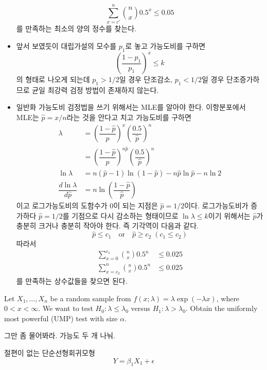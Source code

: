 \documentclass[answers]{exam}
\begin{document}
\begin{questions}
\begin{solution}
\begin{itemize}
      $$
        \sum_{x=c'}^{n}{{n}\choose{x}}0.5^{x}\leq 0.05
      $$
      를 만족하는 최소의 양의 정수를 찾는다.
      \item 앞서 보였듯이 대립가설의 모수를 $p_{1}$로 놓고 가능도비를 구하면
      $$
        \left(\dfrac{1-p_{1}}{p_{1}}\right)^{x} \leq k
      $$
      의 형태로 나오게 되는데 $p_{1}>1/2$일 경우 단조감소, $p_{1}<1/2$일 경우 단조증가하므로 균일 최강력 검정 방법이 존재하지 않는다.
      \item 일반화 가능도비 검정법을 쓰기 위해서는 MLE를 알아야 한다. 이항분포에서 MLE는 $\hat{p}=x/n$라는 것을 안다고 치고 가능도비를 구하면
      \begin{align}
        \lambda &= \left(\dfrac{1-\hat{p}}{\hat{p}}\right)^{x}\left(\dfrac{0.5}{\hat{p}}\right)^{n}\\
        &= \left(\dfrac{1-\hat{p}}{\hat{p}}\right)^{n\hat{p}}\left(\dfrac{0.5}{\hat{p}}\right)^{n}\\
        \ln \lambda &= n\left(\hat{p}-1\right)\ln\left(1-\hat{p}\right)-n\hat{p}\ln \hat{p}-n\ln 2\\
        \dfrac{d \ln \lambda}{d\hat{p}} &= n\ln \left(\dfrac{1-\hat{p}}{\hat{p}}\right)
      \end{align}
      이고 로그가능도비의 도함수가 0이 되는 지점은 $\hat{p}=1/2$이다. 로그가능도비가 증가하다 $\hat{p}=1/2$를 기점으로 다시 감소하는 형태이므로 $\ln \lambda \leq k$이기 위해서는 $\hat{p}$가 충분히 크거나 충분히 작아야 한다. 즉 기각역이 다음과 같다.
      $$
        \hat{p}\leq c_{1} \quad \text{or} \quad \hat{p} \geq c_{2}\;\left(c_{1}\leq c_{2}\right)
      $$
      따라서 
      \begin{align}
        \sum_{x=0}^{c_{1}}{{n}\choose{x}}0.5^{n} &\leq 0.025\\
        \sum_{x=c_{2}}^{n}{{n}\choose{x}}0.5^{n} &\leq 0.025
      \end{align}
      를 만족하는 상수값들을 찾으면 된다.
    \end{itemize}
   \end{solution}
   \question
   Let $X_{1},\ldots, X_{n}$ be a random sample from $f\left(x;\lambda\right)=\lambda\exp\left(-\lambda x\right)$, where $0<x<\infty$. We want to test $H_{0}:\lambda \leq \lambda_{0}$ versus $H_{1}:\lambda > \lambda_{0}$. Obtain the uniformly most powerful (UMP) test with size $\alpha$.
   \begin{solution}
    그만 좀 물어봐라. 가능도 두 개 나눠.
   \end{solution}
   \question
   절편이 없는 단순선형회귀모형
   $$
    Y=\beta_{1}X_{1}+\epsilon
$$
\end{questions}
\end{document}
